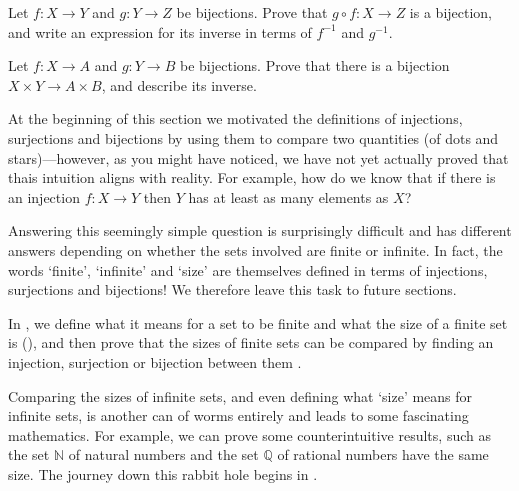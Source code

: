 \begin{exercise}
\label{exCompositeBijection}
Let $f : X \to Y$ and $g : Y \to Z$ be bijections. Prove that $g \circ f : X \to Z$ is a bijection, and write an expression for its inverse in terms of $f^{-1}$ and $g^{-1}$.
\end{exercise}

\begin{exercise}
Let $f : X \to A$ and $g : Y \to B$ be bijections. Prove that there is a bijection $X \times Y \to A \times B$, and describe its inverse.
\end{exercise}

At the beginning of this section we motivated the definitions of injections, surjections and bijections by using them to compare two quantities (of dots and stars)---however, as you might have noticed, we have not yet actually proved that thais intuition aligns with reality. For example, how do we know that if there is an injection $f : X \to Y$ then $Y$ has at least as many elements as $X$?

Answering this seemingly simple question is surprisingly difficult and has different answers depending on whether the sets involved are finite or infinite. In fact, the words `finite', `infinite' and `size' are themselves defined in terms of injections, surjections and bijections! We therefore leave this task to future sections.

In , we define what it means for a set to be finite and what the size of a finite set is (), and then prove that the sizes of finite sets can be compared by finding an injection, surjection or bijection between them .

Comparing the sizes of infinite sets, and even defining what `size' means for infinite sets, is another can of worms entirely and leads to some fascinating mathematics. For example, we can prove some counterintuitive results, such as the set $\mathbb{N}$ of natural numbers and the set $\mathbb{Q}$ of rational numbers have the same size. The journey down this rabbit hole begins in .

